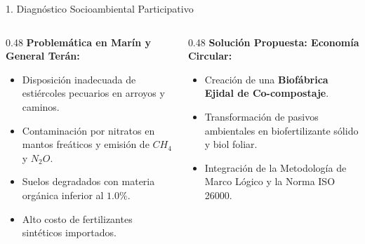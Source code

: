 \documentclass[
  spanish,
  aspectratio=169,
  xcolor={dvipsnames,table}
]{beamer}
\begin{document}
\begin{frame}{1. Diagnóstico Socioambiental Participativo}
  \begin{columns}[T]
    \begin{column}{0.48\textwidth}
      \textbf{\color{uanlblue}Problemática en Marín y General Terán:}
      \begin{itemize}
        \item Disposición inadecuada de estiércoles pecuarios en arroyos y caminos.
        \item Contaminación por nitratos en mantos freáticos y emisión de $CH_4$ y $N_2O$.
        \item Suelos degradados con materia orgánica inferior al $1.0\%$.
        \item Alto costo de fertilizantes sintéticos importados.
      \end{itemize}
    \end{column}
    \begin{column}{0.48\textwidth}
      \textbf{\color{uanlblue}Solución Propuesta: Economía Circular:}
      \begin{itemize}
        \item Creación de una \textbf{Biofábrica Ejidal de Co-compostaje}.
        \item Transformación de pasivos ambientales en biofertilizante sólido y biol foliar.
        \item Integración de la Metodología de Marco Lógico y la Norma ISO 26000.
      \end{itemize}
    \end{column}
  \end{columns}
\end{frame}
\end{document}
